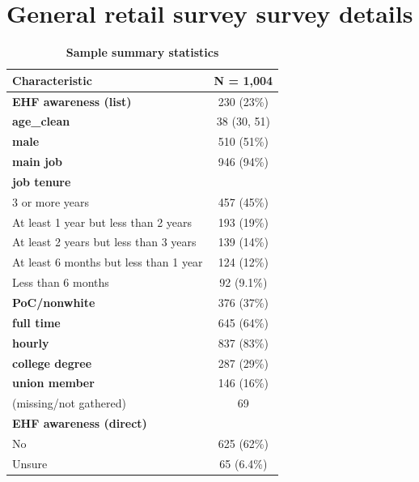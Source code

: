 \documentclass[
  11pt,
  oneside]{article}
\begin{document}
\FloatBarrier
\newpage

\section{General retail survey survey details}\label{app-genpop-survsum}

\begin{table}

\caption{\label{tab:tab-sum-gr}\textbf{Sample summary statistics}}
\centering
\begin{tabular}[t]{l|c}
\hline
\textbf{Characteristic} & \textbf{N = 1,004}\\
\hline
\textbf{EHF awareness (list)} & 230 (23\%)\\
\hline
\textbf{age\_clean} & 38 (30, 51)\\
\hline
\textbf{male} & 510 (51\%)\\
\hline
\textbf{main job} & 946 (94\%)\\
\hline
\textbf{job tenure} & \\
\hline
\hspace{1em}3 or more years & 457 (45\%)\\
\hline
\hspace{1em}At least 1 year but less than 2 years & 193 (19\%)\\
\hline
\hspace{1em}At least 2 years but less than 3 years & 139 (14\%)\\
\hline
\hspace{1em}At least 6 months but less than 1 year & 124 (12\%)\\
\hline
\hspace{1em}Less than 6 months & 92 (9.1\%)\\
\hline
\textbf{PoC/nonwhite} & 376 (37\%)\\
\hline
\textbf{full time} & 645 (64\%)\\
\hline
\textbf{hourly} & 837 (83\%)\\
\hline
\textbf{college degree} & 287 (29\%)\\
\hline
\textbf{union member} & 146 (16\%)\\
\hline
\hspace{1em}(missing/not gathered) & 69\\
\hline
\textbf{EHF awareness (direct)} & \\
\hline
\hspace{1em}No & 625 (62\%)\\
\hline
\hspace{1em}Unsure & 65 (6.4\%)\\

\end{tabular}
\end{table}
\end{document}
